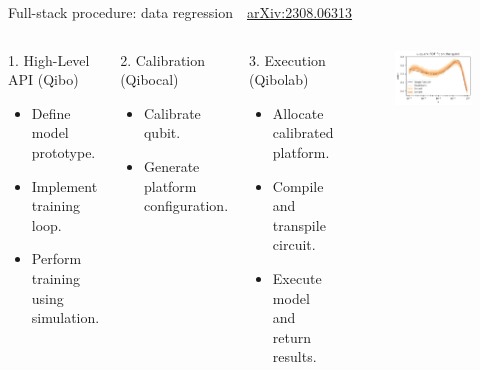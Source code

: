 \documentclass[aspectratio=169, 10pt, xcolor={svgnames}, hyperref={linkcolor=black}]{beamer}
\begin{document}
\begin{frame}{Full-stack procedure: data regression \hfill \faBook\,\, \href{https://arxiv.org/abs/2308.06313}{arXiv:2308.06313}}

   \begin{columns}
     \column{6cm}
     \begin{block}{1. High-Level API (Qibo)}
       \begin{itemize}
         \item Define model prototype.
         \item Implement training loop.
         \item Perform training using simulation.
       \end{itemize}
     \end{block}
     \begin{exampleblock}{2. Calibration (Qibocal)}
     \begin{itemize}
       \item Calibrate qubit.
       \item Generate platform configuration.
     \end{itemize}
     \end{exampleblock}
     \begin{alertblock}{3. Execution (Qibolab)}
       \begin{itemize}
         \item Allocate calibrated platform.
         \item Compile and transpile circuit.
         \item Execute model and return results.
       \end{itemize}
     \end{alertblock}
     \column{6cm}
   \begin{figure}
     \includegraphics[width=\textwidth]{figures/qqpdf.pdf}

\end{figure}
\end{columns}
\end{frame}
\end{document}
